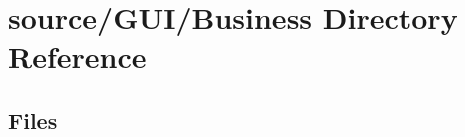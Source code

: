\section{source/\+G\+U\+I/\+Business Directory Reference}
\label{dir_f912a7cd42bfbf9cc593e7b60daaeec8}
\subsection*{Files}
\begin{DoxyCompactItemize}
\end{DoxyCompactItemize}
